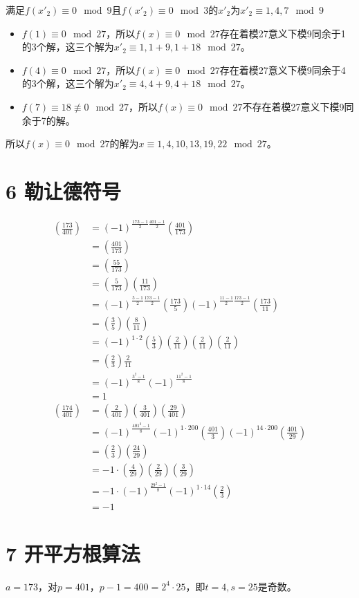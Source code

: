 \documentclass{article}
\begin{document}
满足$f(x'_2) \equiv 0 \mod 9$且$f(x'_2)\equiv 0 \mod 3$的$x'_2$为$x'_2\equiv 1,4,7 \mod 9$
\begin{itemize}
\item
	$f(1)\equiv 0 \mod 27$，所以$f(x) \equiv 0 \mod 27 $存在着模27意义下模9同余于1的3个解，这三个解为$x'_2 \equiv 1,1+9,1+18 \mod 27$。
\item
	$f(4)\equiv 0 \mod 27$，所以$f(x) \equiv 0 \mod 27 $存在着模27意义下模9同余于4的3个解，这三个解为$x'_2 \equiv 4,4+9,4+18 \mod 27$。
\item
	$f(7)\equiv 18 \not\equiv 0 \mod 27$，所以$f(x) \equiv 0 \mod 27 $不存在着模27意义下模9同余于7的解。

\end{itemize}
所以$f(x) \equiv 0 \mod 27$的解为$x\equiv 1,4,10,13,19,22 \mod 27$。
\section*{6 勒让德符号}

$$
\begin{aligned}
(\frac{173}{401})&=(-1)^{\frac{173-1}{2}\frac{401-1}{2}}(\frac{401}{173})\\
&=(\frac{401}{173})\\
&=(\frac{55}{173})\\
&=(\frac{5}{173})(\frac{11}{173})\\
&=(-1)^{\frac{5-1}{2}\frac{173-1}{2}}(\frac{173}{5})(-1)^{\frac{11-1}{2}\frac{173-1}{2}}(\frac{173}{11})\\
&=(\frac{3}{5})(\frac{8}{11})\\
&=(-1)^{1\cdot2}(\frac{5}{3})(\frac{2}{11})(\frac{2}{11})(\frac{2}{11})\\
&=(\frac{2}{3})\frac{2}{11}\\
&=(-1)^{\frac{3^2-1}{8}}(-1)^{\frac{11^2-1}{8}}\\
&=1\\
(\frac{174}{401})&=(\frac{2}{401})(\frac{3}{401})(\frac{29}{401})\\
&=(-1)^{\frac{401^2-1}{8}}(-1)^{1\cdot200}(\frac{401}{3})(-1)^{14\cdot200}(\frac{401}{29})\\
&=(\frac{2}{3})(\frac{24}{29})\\
&=-1\cdot(\frac{4}{29})(\frac{2}{29})(\frac{3}{29})\\
&=-1\cdot(-1)^{\frac{29^2-1}{8}}(-1)^{1\cdot14}(\frac{2}{3})\\
&=-1
\end{aligned}
$$

\section*{7 开平方根算法}
$a=173$，对$p=401$，$p-1=400=2^4\cdot25$，即$t=4,s=25$是奇数。
\end{document}
